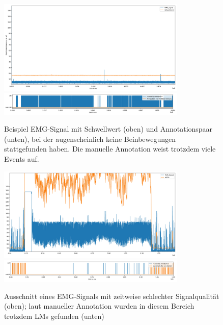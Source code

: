 \begin{figure}[!ht]%
	\begin{center}
	\includegraphics[width=0.80\textwidth]{./Bilder/flatSignalnohumanEMGacq_071085745.edf0,6084000.jpg}
	\includegraphics[width=0.80\textwidth]{./Bilder/flatSignalnohuman2acq_071085745.edf0,6084000.jpg}
	\end{center}
	\caption{Beispiel EMG-Signal mit Schwellwert (oben) und Annotationspaar (unten), bei der augenscheinlich keine Beinbewegungen stattgefunden haben. Die manuelle Annotation weist trotzdem viele Events auf.}%
	\label{fig:flat}%
\end{figure}



\begin{figure}[!ht]%
	\begin{center}
	\includegraphics[width=0.80\textwidth]{./Bilder/badData1EMGacq_000952490.edf4000000,1500000.jpg}
	\includegraphics[width=0.80\textwidth]{./Bilder/badData1acq_000952490.edf4000000,1500000.jpg}
	\end{center}
	\caption{Ausschnitt eines EMG-Signals mit zeitweise schlechter Signalqualität (oben); laut manueller Annotation wurden in diesem Bereich trotzdem LMs gefunden (unten)}%
	\label{fig:Signalquali}%
\end{figure}

